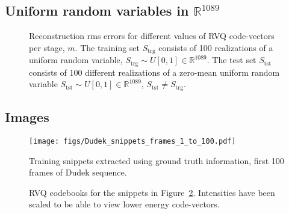 \clearpage
\newpage
\subsection{Uniform random variables in $\mathbb{R}^{1089}$}
								\begin{figure}[h]
								\centering
								\subtable{\begin{tiny}\end{tiny}}
								\caption{Reconstruction rms errors for different values of RVQ code-vectors per stage, $m$.  The training set $S_{\textrm{trg}}$ consists of 100 realizations of a uniform random variable, $S_{\textrm{trg}} \sim U[0, 1] \in \mathbb{R}^{1089}$.  The test set $S_{\textrm{tst}}$ consists of 100 different realizations of a zero-mean uniform random variable 	 $S_{\textrm{tst}} \sim U[0, 1] \in \mathbb{R}^{1089}$, $S_{\textrm{tst}} \neq S_{\textrm{trg}}$.}
								\label{fig:aRVQ_uniform_rand}
								\end{figure}

\clearpage
\newpage
\subsection{Images}
								\begin{figure}[h]
								\centering
								\texttt{[image: figs/Dudek\_snippets\_frames\_1\_to\_100.pdf]}
								\caption{Training snippets extracted using ground truth information, first 100 frames of Dudek sequence.}
								\label{fig:Dudek_1_to_100}
								\end{figure}	

								\begin{figure}[h]
								\centering
								\caption{RVQ codebooks for the snippets in Figure~\ref{fig:Dudek_1_to_100}.  Intensities have been scaled to be able to view lower energy code-vectors.}
								\label{fig:RVQ_Dudek_codebook}
								\end{figure}


